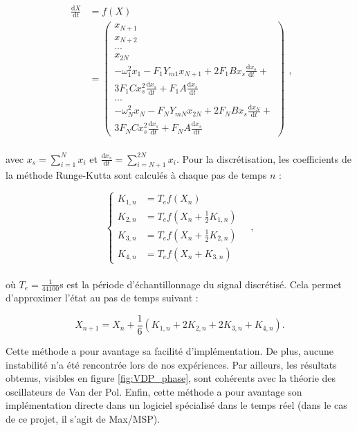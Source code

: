 \begin{equation}
\begin{split}
    \frac{\text{d}X}{\text{d}t} &= f(X) \\
    &= \begin{pmatrix}
        x_{N+1}\\
        x_{N+2}\\
        ...\\
        x_{2N}\\
        -\omega_1^2x_1-F_1Y_{m1}x_{N+1}+2F_1Bx_s\frac{\text{d}x_s}{\text{d}t}+\\
        3F_1Cx_s^2\frac{\text{d}x_s}{\text{d}t}+F_1A\frac{\text{d}x_s}{\text{d}t}\\
        ...\\
        -\omega_N^2x_N-F_NY_{mN}x_{2N}+2F_NBx_s\frac{\text{d}x_N}{\text{d}t}+\\
        3F_NCx_s^2\frac{\text{d}x_s}{\text{d}t}+F_NA\frac{\text{d}x_s}{\text{d}t}
    \end{pmatrix}
\end{split},
\end{equation}\\
avec $x_s=\sum_{i=1}^Nx_i$ et $\frac{\text{d}x_s}{\text{d}t}=\sum_{i=N+1}^{2N}x_i$. Pour la discrétisation, les coefficients de la méthode Runge-Kutta sont calculés à chaque pas de temps $n$ : 

\begin{equation}
\left\{
    \begin{split}
        K_{1,n} &= T_ef(X_n)\\
        K_{2,n} &= T_ef(X_n+\frac{1}{2}K_{1,n})\\
        K_{3,n} &= T_ef(X_n+\frac{1}{2}K_{2,n})\\
        K_{4,n} &= T_ef(X_n+K_{3,n})
    \end{split}\quad ,
    \right.
\end{equation}\\
où $T_e=\frac{1}{44100}$s est la période d'échantillonnage du signal discrétisé. Cela permet d'approximer l'état au pas de temps suivant :

\begin{equation}
    X_{n+1} = X_n+\frac{1}{6}\left(K_{1,n}+2K_{2,n}+2K_{3,n}+K_{4,n}\right).
\end{equation}

Cette méthode a pour avantage sa facilité d'implémentation. De plus, aucune instabilité n'a été rencontrée lors de nos expériences. Par ailleurs, les résultats obtenus, visibles en figure \ref{fig:VDP_phase}, sont cohérents avec la théorie des oscillateurs de Van der Pol. Enfin, cette méthode a pour avantage son implémentation directe dans un logiciel spécialisé dans le temps réel (dans le cas de ce projet, il s'agit de Max/MSP).

